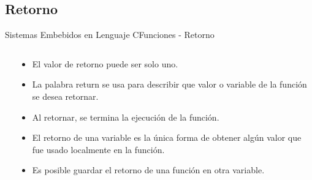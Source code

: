 \documentclass[aspectratio=169, xcolor=dvipsnames]{beamer}
\begin{document}
\subsection{Retorno}
\begin{frame}{Sistemas Embebidos en Lenguaje C}{Funciones - Retorno}
\begin{columns}
    \begin{column}{0.5\textwidth}
    
    \end{column}
    \begin{column}{0.5\textwidth}
    \begin{itemize}
        \item El valor de retorno puede ser solo uno.
        \item La palabra \textcolor{myblue}{return} se usa para describir que valor o variable de la función se desea retornar.
        \item Al retornar, se termina la ejecución de la función.
        \item El retorno de una variable es la única forma de obtener algún valor que fue usado localmente en la función.
        \item Es posible guardar el retorno de una función en otra variable.
    \end{itemize}
    \end{column}
\end{columns}
\end{frame}
\end{document}

